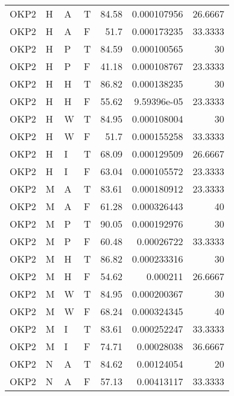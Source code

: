 \begin{longtable}{llllrrr}
    OKP2     & H     & A     & T          & 84.58      & 0.000107956 & 26.6667  \\
    OKP2     & H     & A     & F          & 51.7       & 0.000173235 & 33.3333  \\
    OKP2     & H     & P     & T          & 84.59      & 0.000100565 & 30       \\
    OKP2     & H     & P     & F          & 41.18      & 0.000108767 & 23.3333  \\
    OKP2     & H     & H     & T          & 86.82      & 0.000138235 & 30       \\
    OKP2     & H     & H     & F          & 55.62      & 9.59396e-05 & 23.3333  \\
    OKP2     & H     & W     & T          & 84.95      & 0.000108004 & 30       \\
    OKP2     & H     & W     & F          & 51.7       & 0.000155258 & 33.3333  \\
    OKP2     & H     & I     & T          & 68.09      & 0.000129509 & 26.6667  \\
    OKP2     & H     & I     & F          & 63.04      & 0.000105572 & 23.3333  \\
    OKP2     & M     & A     & T          & 83.61      & 0.000180912 & 23.3333  \\
    OKP2     & M     & A     & F          & 61.28      & 0.000326443 & 40       \\
    OKP2     & M     & P     & T          & 90.05      & 0.000192976 & 30       \\
    OKP2     & M     & P     & F          & 60.48      & 0.00026722  & 33.3333  \\
    OKP2     & M     & H     & T          & 86.82      & 0.000233316 & 30       \\
    OKP2     & M     & H     & F          & 54.62      & 0.000211    & 26.6667  \\
    OKP2     & M     & W     & T          & 84.95      & 0.000200367 & 30       \\
    OKP2     & M     & W     & F          & 68.24      & 0.000324345 & 40       \\
    OKP2     & M     & I     & T          & 83.61      & 0.000252247 & 33.3333  \\
    OKP2     & M     & I     & F          & 74.71      & 0.00028038  & 36.6667  \\
    OKP2     & N     & A     & T          & 84.62      & 0.00124054  & 20       \\
    OKP2     & N     & A     & F          & 57.13      & 0.00413117  & 33.3333  \\

\end{longtable}
